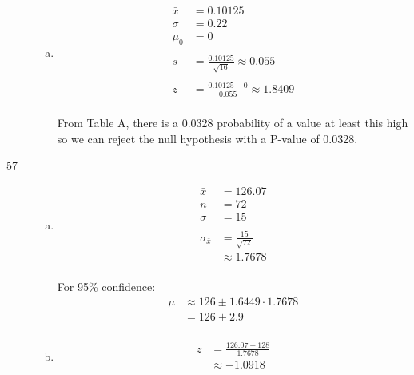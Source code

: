 \documentclass[letterpaper, landscape]{exam}
\begin{document}
\begin{description}
\begin{enumerate}[(a)]
          \item
            \begin{align*}
              \bar{x} & = 0.10125 \\
              \sigma  & = 0.22 \\
              \mu_0   & = 0 \\
              \\
              s       & = \frac{0.10125}{\sqrt{16}} \approx 0.055 \\
              \\
              z & = \frac{0.10125 - 0}{0.055} \approx 1.8409 \\
            \end{align*}

            From Table A, there is a 0.0328 probability of a value at least this
            high so we can reject the null hypothesis with a P-value of 0.0328.

        \end{enumerate}

      \newpage

      \item[57]
        \begin{enumerate}[(a)]
          \item 
            \begin{align*}
              \bar{x} & = 126.07 \\
              n       & = 72 \\
              \sigma  & = 15 \\
              \\
              \sigma_{\bar{x}} & = \frac{15}{\sqrt{72}} \\
                               & \approx 1.7678 \\
            \end{align*}

            For 95\% confidence:
            \begin{align*}
              \mu & \approx 126 \pm 1.6449 \cdot 1.7678 \\
                  & = 126 \pm 2.9 \\
            \end{align*}


          \item 
            \begin{align*}
              z & = \frac{126.07 - 128}{1.7678} \\
                & \approx -1.0918 \\
            \end{align*}


\end{enumerate}
\end{description}
\end{document}
